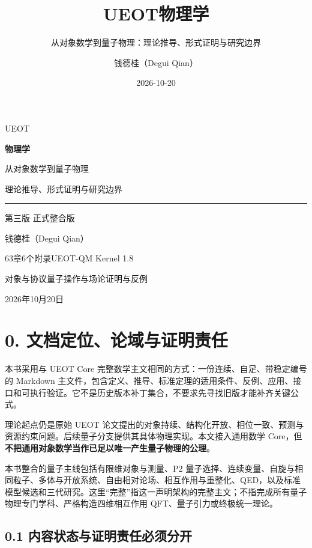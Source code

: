 \documentclass[
  11pt,
  oneside]{book}
\title{UEOT物理学}
\subtitle{从对象数学到量子物理：理论推导、形式证明与研究边界}
\author{钱德桂（Degui Qian）}
\date{2026-10-20}
\renewcommand{\maketitle}{
  \begin{titlepage}
  \thispagestyle{empty}
  \vspace*{30mm}
  {\color{teal}\fontsize{46}{52}\selectfont UEOT\par}
  \vspace{5mm}
  {\fontsize{32}{40}\selectfont\bfseries 物理学\par}
  \vspace{11mm}
  {\Large 从对象数学到量子物理\par}
  \vspace{4mm}
  {\large 理论推导、形式证明与研究边界\par}
  \vspace{10mm}
  {\color{teal}\rule{\textwidth}{1pt}\par}
  \vspace{7mm}
  {\large 第三版\quad 3.4 正式整合版\par}
  \vspace{6mm}
  {钱德桂（Degui Qian）\par}
  \vspace{5mm}
  {63章\quad 6个附录\quad UEOT-QM Kernel 1.8\par}
  \vfill
  {对象与协议\quad 量子操作与场论\quad 证明与反例\par}
  \vspace{7mm}
  {2026年10月20日\par}
  \end{titlepage}
}
\begin{document}
\frontmatter
\maketitle

{
\hypersetup{linkcolor=}
\setcounter{tocdepth}{0}
\tableofcontents
}
\mainmatter
\hypertarget{ch-0}{%
\chapter{0. 文档定位、论域与证明责任}\label{ch-0}}

本书采用与 UEOT Core
完整数学主文相同的方式：一份连续、自足、带稳定编号的 Markdown
主文件，包含定义、推导、标准定理的适用条件、反例、应用、接口和可执行验证。它不是历史版本补丁集合，不要求先寻找旧版才能补齐关键公式。

理论起点仍是原始 UEOT
论文提出的对象持续、结构化开放、相位一致、预测与资源约束问题。后续量子分支提供其具体物理实现。本文接入通用数学
Core，但\textbf{不把通用对象数学当作已足以唯一产生量子物理的公理}。

本书整合的量子主线包括有限维对象与测量、P2
量子选择、连续变量、自旋与相同粒子、多体与开放系统、自由相对论场、相互作用与重整化、QED，以及标准模型候选和三代研究。这里``完整''指这一声明架构的完整主文；不指完成所有量子物理专门学科、严格构造四维相互作用
QFT、量子引力或终极统一理论。

\hypertarget{ux5185ux5bb9ux72b6ux6001ux4e0eux8bc1ux660eux8d23ux4efbux5fc5ux987bux5206ux5f00}{%
\section{0.1
内容状态与证明责任必须分开}\label{ux5185ux5bb9ux72b6ux6001ux4e0eux8bc1ux660eux8d23ux4efbux5fc5ux987bux5206ux5f00}}
\end{document}
